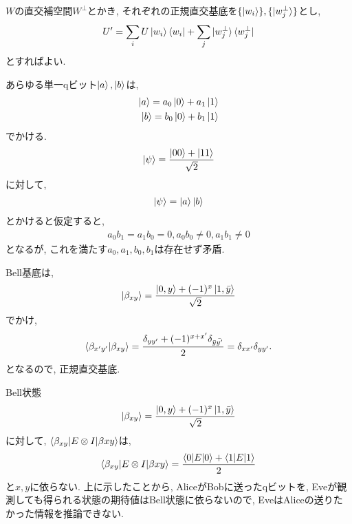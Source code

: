 \begin{ex}
    $W$の直交補空間$W^{\perp}$とかき, それぞれの正規直交基底を$\{ \ket{w_i}\}, \{ \ket{w^{\perp}_j}\}$とし,
    \begin{align*}
        U'
        =
        \sum_{i} U\ket{w_i} \bra{w_i}
        +
        \sum_{j} \ket{w^\perp_j} \bra{w^\perp_j}
    \end{align*}
    とすればよい.
\end{ex}

\begin{ex}
    \label{ex2.68}
    あらゆる単一qビット$\ket{a},\ket{b}$は,
    \begin{align*}
        \ket{a} = a_0 \ket{0} + a_1 \ket{1}
        \\
        \ket{b} = b_0 \ket{0} + b_1 \ket{1}
    \end{align*}
    でかける.
    \begin{align*}
        \ket{\psi} = \frac{\ket{00} + \ket{11}}{\sqrt{2}}
    \end{align*}
    に対して,
    \begin{align*}
        \ket{\psi}
        =
        \ket{a} \ket{b}
    \end{align*}
    とかけると仮定すると,
    \begin{align*}
        a_0 b_1 = a_1 b_0 = 0, a_0 b_0 \neq 0, a_1 b_1 \neq 0
    \end{align*}
    となるが, これを満たす$a_0, a_1, b_0, b_1$は存在せず矛盾.
\end{ex}

\begin{ex}
    \label{ex2.69}
    Bell基底は,
    \begin{align*}
        \ket{\beta_{xy}} = \frac{\ket{0,y}+ (-1)^x\ket{1,\bar{y}}}{\sqrt{2}}
    \end{align*}
    でかけ,
    \begin{align*}
        \braket{\beta_{x'y'}|\beta_{xy}} = \frac{\delta_{yy'}+ (-1)^{x+x'}\delta_{\bar{y}\bar{y'}}}{2} = \delta_{xx'}\delta_{yy'}.
    \end{align*}
    となるので, 正規直交基底.
\end{ex}

\begin{ex}
    \label{ex2.70}
    Bell状態
    \begin{align*}
        \ket{\beta_{xy}} = \frac{\ket{0,y}+ (-1)^x\ket{1,\bar{y}}}{\sqrt{2}}
    \end{align*}
    に対して, $\braket{\beta_{xy}|E \otimes I| \beta{xy}}$は,
    \begin{align*}
        \braket{\beta_{xy}|E \otimes I| \beta{xy}}
        =
        \frac{\braket{0|E|0} + \braket{1|E|1}}{2}
    \end{align*}
    と$x,y$に依らない. 上に示したことから, AliceがBobに送ったqビットを, Eveが観測しても得られる状態の期待値はBell状態に依らないので, EveはAliceの送りたかった情報を推論できない.
\end{ex}

